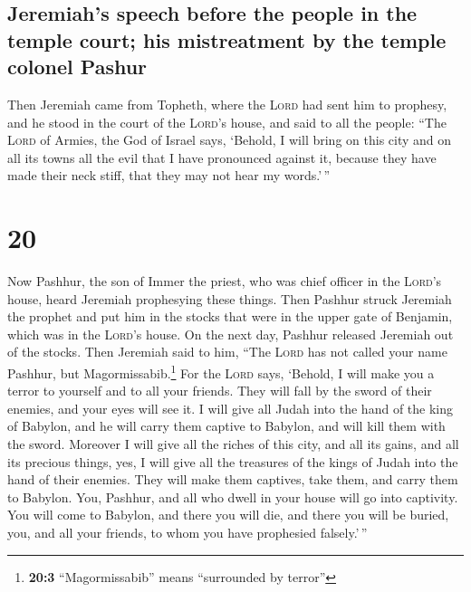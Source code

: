 \hypertarget{jeremiahs-speech-before-the-people-in-the-temple-court-his-mistreatment-by-the-temple-colonel-pashur}{%
\subsection{Jeremiah's speech before the people in the temple court; his
mistreatment by the temple colonel
Pashur}\label{jeremiahs-speech-before-the-people-in-the-temple-court-his-mistreatment-by-the-temple-colonel-pashur}}

 Then Jeremiah came from Topheth, where the \textsc{Lord}
had sent him to prophesy, and he stood in the court of the
\textsc{Lord}'s house, and said to all the people:  ``The
\textsc{Lord} of Armies, the God of Israel says, `Behold, I will bring
on this city and on all its towns all the evil that I have pronounced
against it, because they have made their neck stiff, that they may not
hear my words.'\,''

\hypertarget{section-19}{%
\section{20}\label{section-19}}

 Now Pashhur, the son of Immer the priest, who was chief
officer in the \textsc{Lord}'s house, heard Jeremiah prophesying these
things.  Then Pashhur struck Jeremiah the prophet and put
him in the stocks that were in the upper gate of Benjamin, which was in
the \textsc{Lord}'s house.  On the next day, Pashhur
released Jeremiah out of the stocks. Then Jeremiah said to him, ``The
\textsc{Lord} has not called your name Pashhur, but
Magormissabib.\footnote{\textbf{20:3} ``Magormissabib'' means
  ``surrounded by terror''}  For the \textsc{Lord} says,
`Behold, I will make you a terror to yourself and to all your friends.
They will fall by the sword of their enemies, and your eyes will see it.
I will give all Judah into the hand of the king of Babylon, and he will
carry them captive to Babylon, and will kill them with the sword.
 Moreover I will give all the riches of this city, and all
its gains, and all its precious things, yes, I will give all the
treasures of the kings of Judah into the hand of their enemies. They
will make them captives, take them, and carry them to Babylon.
 You, Pashhur, and all who dwell in your house will go
into captivity. You will come to Babylon, and there you will die, and
there you will be buried, you, and all your friends, to whom you have
prophesied falsely.'\,''

